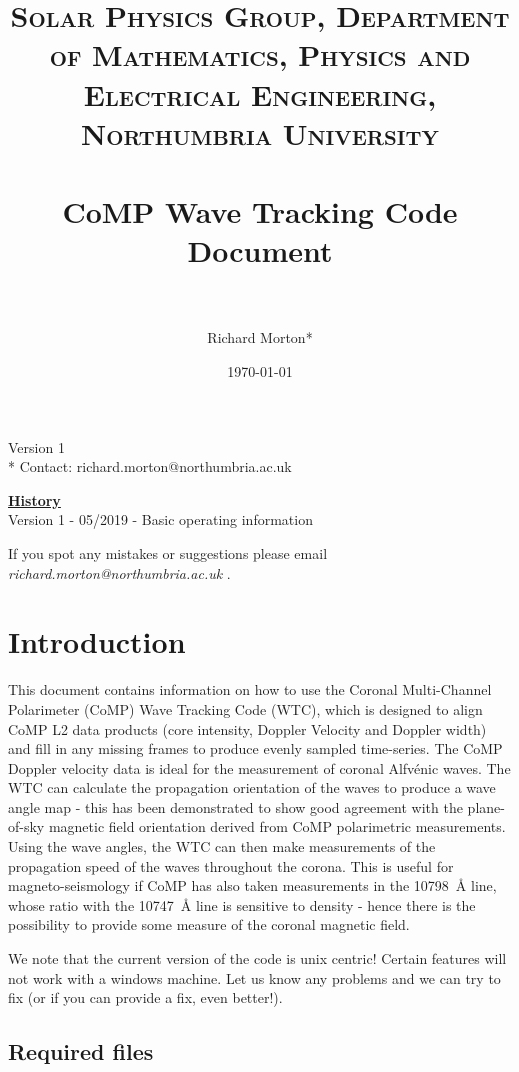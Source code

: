 \documentclass{article}
\title{ 
\normalfont \normalsize 
\textsc{Solar Physics Group, Department of Mathematics, Physics and Electrical Engineering, Northumbria University} \\ [25pt] %
\horrule{0.5pt} \\[0.4cm] %
\huge CoMP Wave Tracking Code Document \\ %
\horrule{2pt} \\[0.5cm] %
}
\author{Richard Morton*} %
\date{\normalsize\today} %
\begin{document}
\maketitle %

\vspace{10cm}

\begin{center}
{Version 1}\\
* Contact: richard.morton@northumbria.ac.uk 
\end{center}

\newpage
\underline{\textbf{History}}\\

Version 1 - 05/2019 - Basic operating information\\


\vspace{2cm}

If you spot any mistakes or suggestions please email \textit{richard.morton@northumbria.ac.uk} .

\newpage
\section{Introduction}

This document contains information on how to use the Coronal Multi-Channel Polarimeter (CoMP) Wave Tracking Code (WTC), 
which is designed to align CoMP L2 data 
products (core intensity, Doppler Velocity and Doppler width) and fill in any missing frames to produce evenly sampled 
time-series. The CoMP Doppler velocity data is ideal for the measurement of coronal Alfv\'enic waves. The WTC can calculate the 
propagation orientation of the waves to produce a wave angle map - this has been demonstrated to show good agreement with 
the plane-of-sky magnetic field orientation derived from CoMP polarimetric measurements. Using the wave angles, the WTC can 
then make measurements of the propagation speed of the waves throughout the corona. This is useful for magneto-seismology if
CoMP has also taken measurements in the 10798~{\AA} line, whose ratio with the 10747~{\AA} line is sensitive to density - hence
there is the possibility to provide some measure of the coronal magnetic field.

\medskip
We note that the current version of the code is unix centric! Certain features will not work with a windows machine.
Let us know any problems and we can try to fix (or if you can provide a fix, even better!).

\subsection{Required files}
\end{document}
